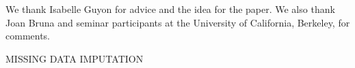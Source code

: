 \documentclass[10pt]{book}
\theoremstyle{definition}
\begin{document}
We thank Isabelle Guyon for advice and the idea for the paper. We also thank Joan Bruna and seminar participants at the University of California, Berkeley, for comments. %
\par

{\hfill {\footnotesize\rm MISSING DATA IMPUTATION} \hfill}

\bibhang=1.7pc
\bibsep=2pt
\fontsize{9}{14pt plus.8pt minus .6pt}\selectfont
\renewcommand\bibname{\large \bf References} 
%
%

%



%
\end{document}
